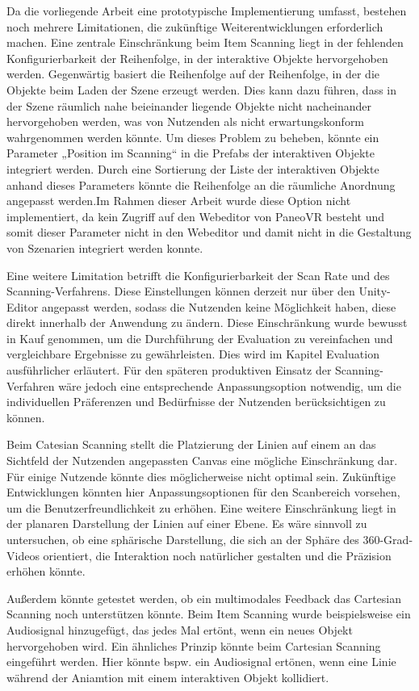 Da die vorliegende Arbeit eine prototypische Implementierung umfasst, bestehen noch mehrere Limitationen, die zukünftige Weiterentwicklungen erforderlich machen.
Eine zentrale Einschränkung beim Item Scanning liegt in der fehlenden Konfigurierbarkeit der Reihenfolge, in der interaktive Objekte hervorgehoben werden. Gegenwärtig basiert die Reihenfolge auf der Reihenfolge, in der die Objekte beim Laden der Szene erzeugt werden. Dies kann dazu führen, dass in der Szene räumlich nahe beieinander liegende Objekte nicht nacheinander hervorgehoben werden, was von Nutzenden als nicht erwartungskonform wahrgenommen werden könnte. Um dieses Problem zu beheben, könnte ein Parameter „Position im Scanning“ in die Prefabs der interaktiven Objekte integriert werden. Durch eine Sortierung der Liste der interaktiven Objekte anhand dieses Parameters könnte die Reihenfolge an die räumliche Anordnung angepasst werden.Im Rahmen dieser Arbeit wurde diese Option nicht implementiert, da kein Zugriff auf den Webeditor von PaneoVR besteht und somit dieser Parameter nicht in den Webeditor und damit nicht in die Gestaltung von Szenarien integriert werden konnte. 

Eine weitere Limitation betrifft die Konfigurierbarkeit der Scan Rate und des Scanning-Verfahrens. Diese Einstellungen können derzeit nur über den Unity-Editor angepasst werden, sodass die Nutzenden keine Möglichkeit haben, diese direkt innerhalb der Anwendung zu ändern. Diese Einschränkung wurde bewusst in Kauf genommen, um die Durchführung der Evaluation zu vereinfachen und vergleichbare Ergebnisse zu gewährleisten. Dies wird im Kapitel Evaluation ausführlicher erläutert. 
Für den späteren produktiven Einsatz der Scanning-Verfahren wäre jedoch eine entsprechende Anpassungsoption notwendig, um die individuellen Präferenzen und Bedürfnisse der Nutzenden berücksichtigen zu können.

Beim Catesian Scanning stellt die Platzierung der Linien auf einem an das Sichtfeld der Nutzenden angepassten Canvas eine mögliche Einschränkung dar. Für einige Nutzende könnte dies möglicherweise nicht optimal sein. Zukünftige Entwicklungen könnten hier Anpassungsoptionen für den Scanbereich vorsehen, um die Benutzerfreundlichkeit zu erhöhen. Eine weitere Einschränkung liegt in der planaren Darstellung der Linien auf einer Ebene. Es wäre sinnvoll zu untersuchen, ob eine sphärische Darstellung, die sich an der Sphäre des 360-Grad-Videos orientiert, die Interaktion noch natürlicher gestalten und die Präzision erhöhen könnte.

Außerdem könnte getestet werden, ob ein multimodales Feedback das Cartesian Scanning noch unterstützen könnte. Beim Item Scanning wurde beispielsweise ein Audiosignal hinzugefügt, das jedes Mal ertönt, wenn ein neues Objekt hervorgehoben wird. Ein ähnliches Prinzip könnte beim Cartesian Scanning eingeführt werden. Hier könnte bspw. ein Audiosignal ertönen, wenn eine Linie während der Aniamtion mit einem interaktiven Objekt kollidiert. 

